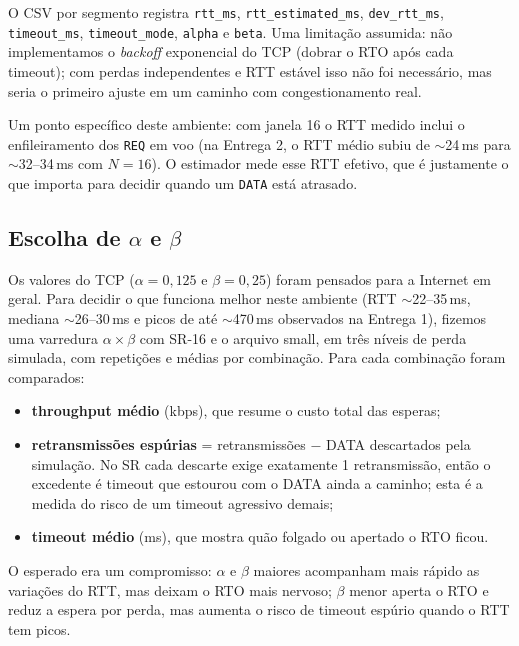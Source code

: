 \documentclass[11pt,a4paper]{article}
\newcommand{\cod}[1]{\textcolor{codverde}{\texttt{\small #1}}}
\begin{document}
O CSV por segmento registra \cod{rtt\_ms}, \cod{rtt\_estimated\_ms}, \cod{dev\_rtt\_ms},
\cod{timeout\_ms}, \cod{timeout\_mode}, \cod{alpha} e \cod{beta}. Uma limitação assumida: não
implementamos o \emph{backoff} exponencial do TCP (dobrar o RTO após cada timeout); com perdas
independentes e RTT estável isso não foi necessário, mas seria o primeiro ajuste em um caminho com
congestionamento real.

Um ponto específico deste ambiente: com janela 16 o RTT medido inclui o enfileiramento dos \cod{REQ}
em voo (na Entrega 2, o RTT médio subiu de $\sim$24\,ms para $\sim$32--34\,ms com $N = 16$). O
estimador mede esse RTT efetivo, que é justamente o que importa para decidir quando um \cod{DATA}
está atrasado.

\subsection{Escolha de \texorpdfstring{$\alpha$}{alfa} e \texorpdfstring{$\beta$}{beta}}\label{sec:alfa-beta}

Os valores do TCP ($\alpha = 0{,}125$ e $\beta = 0{,}25$) foram pensados para a Internet em geral.
Para decidir o que funciona melhor neste ambiente (RTT $\sim$22--35\,ms, mediana $\sim$26--30\,ms e
picos de até $\sim$470\,ms observados na Entrega 1), fizemos uma varredura $\alpha \times \beta$ com
SR-16 e o arquivo small, em três níveis de perda simulada, com repetições e médias por combinação.
Para cada combinação foram comparados:
\begin{itemize}
  \item \textbf{throughput médio} (kbps), que resume o custo total das esperas;
  \item \textbf{retransmissões espúrias} = retransmissões $-$ DATA descartados pela simulação. No SR
        cada descarte exige exatamente 1 retransmissão, então o excedente é timeout que estourou com o
        DATA ainda a caminho; esta é a medida do risco de um timeout agressivo demais;
  \item \textbf{timeout médio} (ms), que mostra quão folgado ou apertado o RTO ficou.
\end{itemize}
O esperado era um compromisso: $\alpha$ e $\beta$ maiores acompanham mais rápido as variações do RTT,
mas deixam o RTO mais nervoso; $\beta$ menor aperta o RTO e reduz a espera por perda, mas aumenta o
risco de timeout espúrio quando o RTT tem picos.
\end{document}
